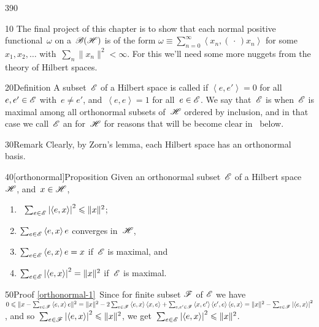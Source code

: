 \begin{parsec}{390}%
\begin{point}{10}%
The final project of this chapter
is to show that each normal positive functional~$\omega$ 
on a~$\mathscr{B}(\mathscr{H})$
	is of the form 
	$\omega\equiv \sum_{n=0}^\infty\left<x_n,(\,\cdot\,)x_n\right>$
	for some~$x_1,x_2,\dotsc$
	with~$\sum_n\|x_n\|^2<\infty$.
For this we'll need some more nuggets
from the theory of Hilbert spaces.
\end{point}
\begin{point}{20}{Definition}%
A subset~$\mathscr{E}$ of a Hilbert space
is called %
if $\left<e,e'\right>=0$
for all~$e,e'\in\mathscr{E}$ with~$e\neq e'$,
and~$\left<e,e\right>=1$
for all~$e\in\mathscr{E}$.
We say that~$\mathscr{E}$ is 
when~$\mathscr{E}$ is maximal
among all orthonormal  subsets of~$\mathscr{H}$
ordered by inclusion,
and in that case
we call~$\mathscr{E}$ an %
for~$\mathscr{H}$
for reasons that will be become clear in~
below.
\begin{point}{30}{Remark}%
Clearly, by Zorn's lemma,
each Hilbert space has an orthonormal basis.
\end{point}
\end{point}
\begin{point}{40}[orthonormal]{Proposition}%
Given an orthonormal subset~$\mathscr{E}$
of a Hilbert space~$\mathscr{H}$,
and~$x\in \mathscr{H}$,
\begin{enumerate}
\item
\label{orthonormal-1}
%
\ 
 $\sum_{e\in \mathscr{E}}\left|\left<e,x\right>\right|^2
\leqslant \|x\|^2$;
\item
\label{orthonormal-2}
$\sum_{e\in \mathscr{E}} \left<e,x\right>e$
converges in~$\mathscr{H}$,
\item
\label{orthonormal-3}
$\sum_{e\in \mathscr{E}} \left<e,x\right>e=x$
if~$\mathscr{E}$ is maximal, and
\item
\label{orthonormal-4}
%
$\sum_{e\in\mathscr{E}}\left|\left<e,x\right>\right|^2 = \|x\|^2$
if~$\mathscr{E}$ is maximal.
\end{enumerate}
\begin{point}{50}{Proof}%
\ref{orthonormal-1}\ 
Since for finite subset $\mathscr{F}$ of $\mathscr{E}$
we have $0\leqslant \|x-\sum_{e\in \mathscr{F}} \left<e,x\right>e\|^2
= \|x\|^2-2\sum_{e\in \mathscr{F}} \left<e,x\right>\left<x,e\right>
+ \sum_{e,e'\in\mathscr{F}} \left<x,e'\right>\left<e',e\right>\left<e,x\right>
= \|x\|^2-\sum_{e\in\mathscr{F}}\left|\left<e,x\right>\right|^2$,
and so~$\sum_{e\in\mathscr{F}} \left|\left<e,x\right>\right|^2\leqslant \|x\|^2$,
we get~$\sum_{e\in\mathscr{E}}\left|\left<e,x\right>\right|^2\leqslant \|x\|^2$.


\end{point}
\end{point}
\end{parsec}
